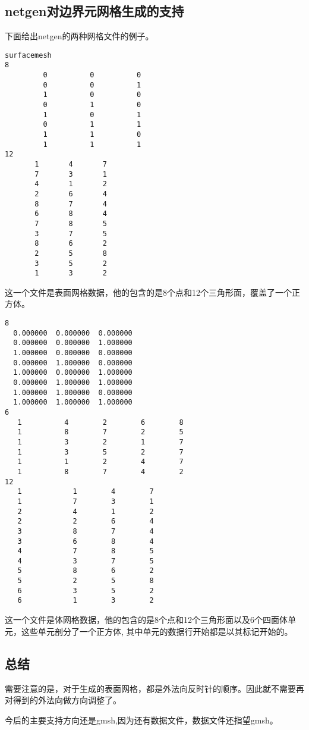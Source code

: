 \subsection{netgen对边界元网格生成的支持}
下面给出netgen的两种网格文件的例子\cite{schoberl1997netgen}。
\begin{lstlisting}
surfacemesh
8
         0          0          0 
         0          0          1 
         1          0          0 
         0          1          0 
         1          0          1 
         0          1          1 
         1          1          0 
         1          1          1 
12
       1       4       7
       7       3       1
       4       1       2
       2       6       4
       8       7       4
       6       8       4
       7       8       5
       3       7       5
       8       6       2
       2       5       8
       3       5       2
       1       3       2
\end{lstlisting}
这一个文件是表面网格数据，他的包含的是8个点和12个三角形面，覆盖了一个正方体。
\begin{lstlisting}
8
  0.000000  0.000000  0.000000
  0.000000  0.000000  1.000000
  1.000000  0.000000  0.000000
  0.000000  1.000000  0.000000
  1.000000  0.000000  1.000000
  0.000000  1.000000  1.000000
  1.000000  1.000000  0.000000
  1.000000  1.000000  1.000000
6
   1          4        2        6        8
   1          8        7        2        5
   1          3        2        1        7
   1          3        5        2        7
   1          1        2        4        7
   1          8        7        4        2
12
   1            1        4        7
   1            7        3        1
   2            4        1        2
   2            2        6        4
   3            8        7        4
   3            6        8        4
   4            7        8        5
   4            3        7        5
   5            8        6        2
   5            2        5        8
   6            3        5        2
   6            1        3        2
\end{lstlisting}
这一个文件是体网格数据，他的包含的是8个点和12个三角形面以及6个四面体单元，这些单元剖分了一个正方体, 其中单元的数据行开始都是以其标记开始的。

\subsection{总结}
需要注意的是，对于生成的表面网格，都是外法向反时针的顺序。因此就不需要再对得到的外法向做方向调整了。

今后的主要支持方向还是gmsh,因为还有数据文件，数据文件还指望gmsh。
\newpage
